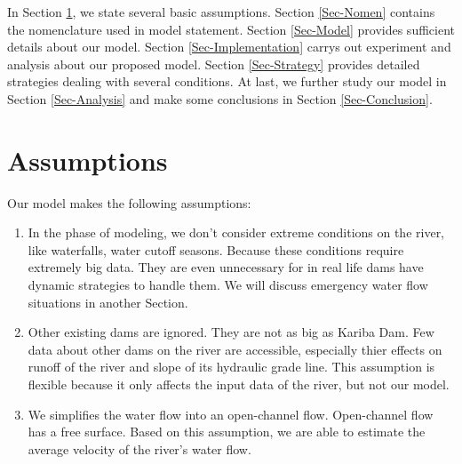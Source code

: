\documentclass{mcmthesis}
\begin{document}
In Section \ref{Sec-Assume}, we state several basic assumptions. Section \ref{Sec-Nomen} contains the nomenclature used in model statement. Section \ref{Sec-Model} provides sufficient details about our model. Section \ref{Sec-Implementation} carrys out experiment and analysis about our proposed model. Section \ref{Sec-Strategy} provides detailed strategies dealing with several conditions. At last, we further study our model in Section \ref{Sec-Analysis} and make some conclusions in Section \ref{Sec-Conclusion}.
\section{Assumptions}\label{Sec-Assume}
Our model makes the following assumptions:
\begin{enumerate}
	\item In the phase of modeling, we don't consider extreme conditions on the river, like waterfalls, water cutoff seasons. Because these conditions require extremely big data. They are  even unnecessary for in real life dams have dynamic strategies to handle them. We will discuss emergency water flow situations in another Section.
	\item Other existing dams are ignored. They are not as big as Kariba Dam. Few data about other dams on the river are accessible, especially thier effects on runoff of the river and slope of its hydraulic grade line. This assumption is flexible because it only affects the input data of the river, but not our model.
	\item We simplifies the water flow into an open-channel flow. Open-channel flow has a free surface. Based on this assumption, we are able to estimate the average velocity of the river's water flow.
\end{enumerate}
\end{document}
